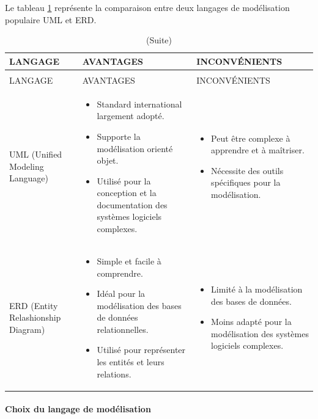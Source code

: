\documentclass[12pt]{report}
\begin{document}
				Le tableau \ref{tab:tableau 14} représente la comparaison entre deux langages de modélisation populaire UML et ERD.

				
				\begin{longtable}{|p{3cm}|p{5.5cm}|p{5.5cm}|} 
						\caption{Comparaison entre UML et ERD.} 
						\label{tab:tableau 14}\\ 
						\hline 
						LANGAGE & AVANTAGES & INCONVÉNIENTS\\ 
						\hline 
						\endfirsthead 	
						\caption[]{(Suite)}\\ 
						\hline 
						LANGAGE & AVANTAGES & INCONVÉNIENTS\\ 
						\hline 
						\endhead
						UML (Unified Modeling Language) &
						\begin{itemize}
							\item Standard international largement adopté.
							\item Supporte la modélisation orienté objet.
							\item Utilisé pour la conception et la documentation des systèmes logiciels complexes.
						\end{itemize}
						&
						\begin{itemize}
							\item Peut être complexe à apprendre et à maîtriser. 
							\item Nécessite des outils spécifiques pour la modélisation.
						\end{itemize}\\						
						\hline
						ERD (Entity Relashionship Diagram) &
						\begin{itemize}
							\item Simple et facile à comprendre.
							\item Idéal pour la modélisation des bases de données relationnelles.
							\item Utilisé pour représenter les entités et leurs relations.
						\end{itemize} &
						\begin{itemize}
							\item Limité à la modélisation des bases de données.
							\item Moins adapté pour la modélisation des systèmes logiciels complexes.
						\end{itemize} \\
						\hline
				    \end{longtable}

				\paragraph{Choix du langage de modélisation} 
			
\end{document}
